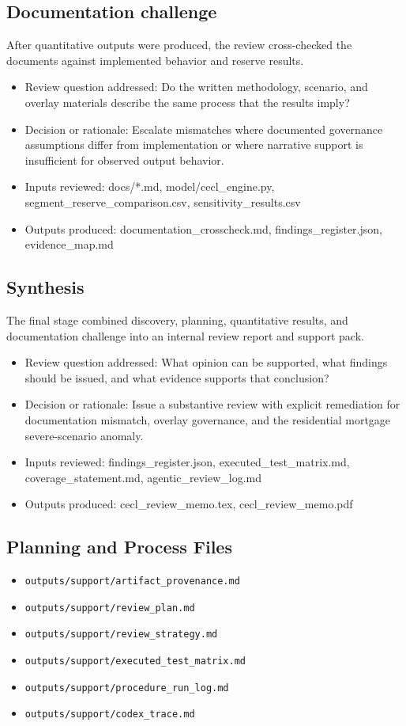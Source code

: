 \documentclass[11pt]{article}
\begin{document}
\subsection*{Documentation challenge}
After quantitative outputs were produced, the review cross-checked the documents against implemented behavior and reserve results.
\begin{itemize}
\item Review question addressed: Do the written methodology, scenario, and overlay materials describe the same process that the results imply?
\item Decision or rationale: Escalate mismatches where documented governance assumptions differ from implementation or where narrative support is insufficient for observed output behavior.
\item Inputs reviewed: docs/*.md, model/cecl\_engine.py, segment\_reserve\_comparison.csv, sensitivity\_results.csv
\item Outputs produced: documentation\_crosscheck.md, findings\_register.json, evidence\_map.md
\end{itemize}
\subsection*{Synthesis}
The final stage combined discovery, planning, quantitative results, and documentation challenge into an internal review report and support pack.
\begin{itemize}
\item Review question addressed: What opinion can be supported, what findings should be issued, and what evidence supports that conclusion?
\item Decision or rationale: Issue a substantive review with explicit remediation for documentation mismatch, overlay governance, and the residential mortgage severe-scenario anomaly.
\item Inputs reviewed: findings\_register.json, executed\_test\_matrix.md, coverage\_statement.md, agentic\_review\_log.md
\item Outputs produced: cecl\_review\_memo.tex, cecl\_review\_memo.pdf
\end{itemize}
\subsection*{Planning and Process Files}
\begin{itemize}
\item \texttt{outputs/support/artifact\_provenance.md}
\item \texttt{outputs/support/review\_plan.md}
\item \texttt{outputs/support/review\_strategy.md}
\item \texttt{outputs/support/executed\_test\_matrix.md}
\item \texttt{outputs/support/procedure\_run\_log.md}
\item \texttt{outputs/support/codex\_trace.md}
\end{itemize}
\end{document}
